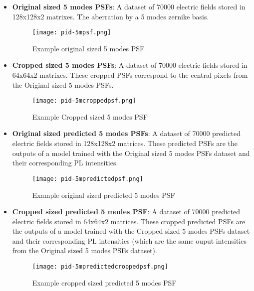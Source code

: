 \begin{itemize}
				\item \textbf{Original sized 5 modes PSFs}: A dataset of 70000 electric fields stored in 128x128x2 matrixes. The aberration by a 5 modes zernike basis.
				\begin{figure*}[ht!]
					\centering
					\texttt{[image: pid-5mpsf.png]}
					\caption{Example original sized 5 modes PSF}\hspace{\fill}
				\end{figure*}				
				\item \textbf{Cropped sized 5 modes PSFs}:  A dataset of 70000 electric fields stored in 64x64x2 matrixes. These cropped  PSFs correspond to the central pixels from the Original sized 5 modes PSFs.
				\begin{figure*}[ht!]
					\centering
					\texttt{[image: pid-5mcroppedpsf.png]}
					\caption{Example Cropped sized 5 modes PSF}\hspace{\fill}
				\end{figure*}			
				\item \textbf{Original sized predicted 5 modes PSFs}:  A dataset of 70000 predicted electric fields stored in 128x128x2 matrices. These predicted PSFs are the outputs of a model trained with the Original sized 5 modes PSFs dataset and their corresponding PL intensities.
				\begin{figure*}[ht!]
					\centering
					\texttt{[image: pid-5mpredictedpsf.png]}
					\caption{Example original sized predicted 5 modes PSF}\hspace{\fill}
				\end{figure*}			
				\item \textbf{Cropped sized predicted 5 modes PSF}: A dataset of 70000 predicted electric fields stored in 64x64x2 matrices. These cropped predicted PSFs are the outputs of a model trained with the Cropped sized 5 modes PSFs dataset and their corresponding PL intensities (which are the same ouput intensities from the Original sized 5 modes PSFs dataset).
				\begin{figure*}[ht!]
					\centering
					\texttt{[image: pid-5mpredictedcroppedpsf.png]}
					\caption{Example cropped sized predicted 5 modes PSF}\hspace{\fill}
				\end{figure*}
				\FloatBarrier
				

\end{itemize}
